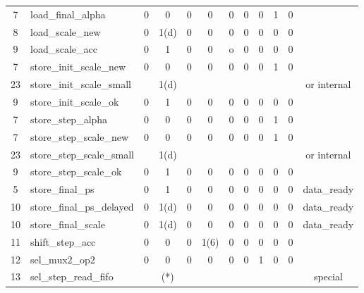 \documentclass[mscthesis]{usiinfthesis}
\begin{document}
\begin{table}
\begin{center}
\begin{tabular}{|c|l|*{10}{c|}}
    7    & load\_final\_alpha          & 0    & 0      & 0    & 0          & 0      & 0      & 0    & 1    & 0     &             \\
    8    & load\_scale\_new            & 0    & 1(d)   & 0    & 0          & 0      & 0      & 0    & 0    & 0     &             \\
    9    & load\_scale\_acc            & 0    & 1      & 0    & 0          & o      & 0      & 0    & 0    & 0     &             \\
    7    & store\_init\_scale\_new     & 0    & 0      & 0    & 0          & 0      & 0      & 0    & 1    & 0     &             \\
    23   & store\_init\_scale\_small   &      & 1(d)   &      &            &        &        &      &      &       & or internal \\
    9    & store\_init\_scale\_ok      & 0    & 1      & 0    & 0          & 0      & 0      & 0    & 0    & 0     &             \\
    7    & store\_step\_alpha          & 0    & 0      & 0    & 0          & 0      & 0      & 0    & 1    & 0     &             \\
    7    & store\_step\_scale\_new     & 0    & 0      & 0    & 0          & 0      & 0      & 0    & 1    & 0     &             \\
    23   & store\_step\_scale\_small   &      & 1(d)   &      &            &        &        &      &      &       & or internal \\
    9    & store\_step\_scale\_ok      & 0    & 1      & 0    & 0          & 0      & 0      & 0    & 0    & 0     &             \\
    5    & store\_final\_ps            & 0    & 1      & 0    & 0          & 0      & 0      & 0    & 0    & 0     & data\_ready \\
    10   & store\_final\_ps\_delayed   & 0    & 1(d)   & 0    & 0          & 0      & 0      & 0    & 0    & 0     & data\_ready \\
    10   & store\_final\_scale         & 0    & 1(d)   & 0    & 0          & 0      & 0      & 0    & 0    & 0     & data\_ready \\
    11   & shift\_step\_acc            & 0    & 0      & 0    & 1(6)       & 0      & 0      & 0    & 0    & 0     &             \\
    12   & sel\_mux2\_op2              & 0    & 0      & 0    & 0          & 0      & 0      & 1    & 0    & 0     &             \\
    13   & sel\_step\_read\_fifo       &      & (*)    &      &            &        &        &      &      &       & special     \\

\end{tabular}
\end{center}
\end{table}
\end{document}
